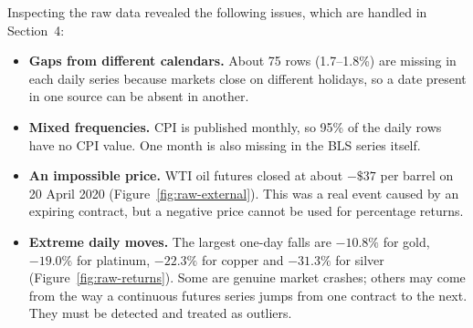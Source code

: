 Inspecting the raw data revealed the following issues, which are handled in
Section~4:
\begin{itemize}
  \item \textbf{Gaps from different calendars.} About 75 rows (1.7--1.8\%) are
        missing in each daily series because markets close on different
        holidays, so a date present in one source can be absent in another.
  \item \textbf{Mixed frequencies.} CPI is published monthly, so 95\% of the
        daily rows have no CPI value. One month is also missing in the BLS
        series itself.
  \item \textbf{An impossible price.} WTI oil futures closed at about
        $-\$37$ per barrel on 20 April 2020 (Figure~\ref{fig:raw-external}). This
        was a real event caused by an expiring contract, but a negative price
        cannot be used for percentage returns.
  \item \textbf{Extreme daily moves.} The largest one-day falls are
        $-10.8\%$ for gold, $-19.0\%$ for platinum, $-22.3\%$ for copper and
        $-31.3\%$ for silver (Figure~\ref{fig:raw-returns}). Some are genuine
        market crashes; others may come from the way a continuous futures series
        jumps from one contract to the next. They must be detected and treated
        as outliers.
\end{itemize}